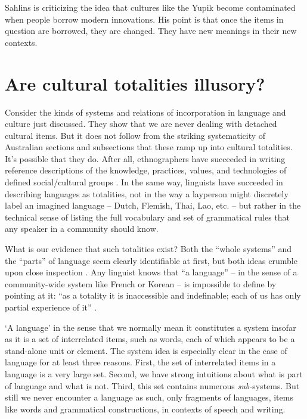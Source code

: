 Sahlins is criticizing the idea that cultures like the Yupik 
become contaminated when people borrow modern innovations. His point is that once the items in question are borrowed, they are changed. They have new meanings in their new contexts. 



\section{Are cultural totalities illusory?}

Consider the kinds of systems and relations of incorporation in language and 
culture just discussed. They show that we are never dealing with 
detached cultural items. But it does not follow from the striking 
systematicity of Australian sections and subsections that 
these ramp up into cultural totalities. It's possible that they do. After all, ethnographers have 
succeeded in writing reference descriptions of the knowledge, practices, 
values, and technologies of defined social/cultural groups  \citep{radcliffe-brown_andaman_1922,bronislaw_malinowski_argonauts_1922,firth_we_1936,evans-pritchard_nuer:_1940,fortes_dynamics_1945}. In the same way, linguists have succeeded in describing languages as 
totalities, not in the way a layperson might discretely label an 
imagined language -- Dutch, Flemish, Thai, Lao, etc. -- but rather in the technical sense of listing the full vocabulary and set of 
grammatical rules that any speaker in a community should know. 



What is our evidence that such totalities exist? Both the ``whole 
systems'' and the ``parts'' of language seem clearly identifiable at first, but both ideas crumble upon close inspection \citep{le_page_acts_1985,hudson_sociolinguistics_1996}. Any linguist knows that 
``a language'' -- in the sense of a community-wide system like French or 
Korean -- is impossible to define by pointing at 
it: ``as a totality it is inaccessible and indefinable; each of us has 
only partial experience of it'' \citep[191]{le_page_acts_1985}. 



`A language' in the sense that we normally mean it constitutes a system 
insofar as it is a set of interrelated items, such as words, each of 
which appears to be a stand-alone unit or element. The system idea is 
especially clear in the case of language for at least three reasons. First, the set of 
interrelated items in a language is a very large set. Second, we have 
strong intuitions about what is part of language and what is not. Third, this set contains numerous \textit{sub-}systems. 
But still we never encounter a language as such, only fragments of 
languages, items like words and grammatical constructions, in contexts of speech and writing. 



